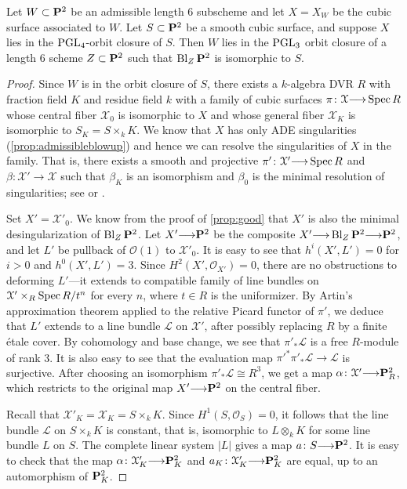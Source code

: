 \documentclass[11pt,reqno, letterpaper]{amsart}
\renewcommand{\k}{k}
\DeclareMathOperator{\Bl}{Bl}
\renewcommand{\to}{{\longrightarrow}}
\numberwithin{equation}{section}
\renewcommand{\O}{\mathcal O}
\begin{document}
\begin{proposition}\label{prop:cubictopoints}
  Let $W \subset \P^2$ be an admissible length 6 subscheme and let $X = X_W$ be the cubic surface associated to $W$.
  Let $S \subset \P^2$ be a smooth cubic surface, and suppose $X$ lies in the $\PGL_4$-orbit closure of $S$.
  Then $W$ lies in the $\PGL_3$ orbit closure of a length 6 scheme $Z \subset \P^2$ such that $\Bl_Z \P^2$ is isomorphic to $S$.
\end{proposition}
\begin{proof}
  Since $W$ is in the orbit closure of $S$, there exists a $\k$-algebra DVR $R$ with fraction field $K$ and residue field $k$ with a family of cubic surfaces $\pi \colon \mathcal X \to \spec R$ whose central fiber $\mathcal X_0$ is isomorphic to $X$ and whose general fiber $\mathcal X_K$ is isomorphic to $S_K = S \times_k K$.
  We know that $X$ has only ADE singularities (\autoref{prop:admissibleblowup}) and hence we can resolve the singularities of $X$ in the family.
  That is, there exists a smooth and projective $\pi' \colon \mathcal X' \to \spec R$ and $\beta \colon \mathcal X' \to \mathcal X$ such that $\beta_K$ is an isomorphism and $\beta_0$ is the minimal resolution of singularities; see \cite{bri:70} or \cite{tju:70}.

  Set $X' = \mathcal X'_0$.
  We know from the proof of \autoref{prop:good} that $X'$ is also the minimal desingularization of $\Bl_Z\P^2$.
  Let $X' \to \P^2$ be the composite $X' \to \Bl_Z \P^2 \to \P^2$, and let $L'$ be pullback of $\O(1)$ to $\mathcal X'_0$.
  It is easy to see that $h^i(X', L') = 0$ for $i > 0$ and $h^0(X', L') = 3$.
  Since $H^2(X', \O_{X'}) = 0$, there are no obstructions to deforming $L'$---it extends to compatible family of line bundles on $\mathcal X' \times_R \spec R/t^n$ for every $n$, where $t \in R$ is the uniformizer. 
  By Artin's approximation theorem \cite{art:69} applied to the relative Picard functor of $\pi'$, we deduce that $L'$ extends to a line bundle $\mathcal L$ on $\mathcal X'$, after possibly replacing $R$ by a finite \'etale cover.
  By cohomology and base change, we see that $\pi'_* \mathcal L$ is a free $R$-module of rank 3.
  It is also easy to see that the evaluation map $\pi'^*\pi'_* \mathcal L \to \mathcal L$ is surjective.
  After choosing an isomorphism $\pi'_* \mathcal L \cong R^3$, we get a map $\alpha \colon \mathcal X' \to \P^2_R$, which restricts to the original map $X' \to \P^2$ on the central fiber.
  
  Recall that $\mathcal X'_K = \mathcal X_K = S \times_k K$.
  Since $H^1(S, \O_S) = 0$, it follows that the line bundle $\mathcal L$ on $S \times_k K$ is constant, that is, isomorphic to $L \otimes_k K$ for some line bundle $L$ on $S$.
  The complete linear system $|L|$ gives a map $a \colon S \to \P^2$.
  It is easy to check that the map $\alpha \colon \mathcal X'_K \to \P^2_K$ and $a_K \colon \mathcal X'_K \to \P^2_K$ are equal, up to an automorphism of $\P^2_K$.
  

\end{proof}
\end{document}
